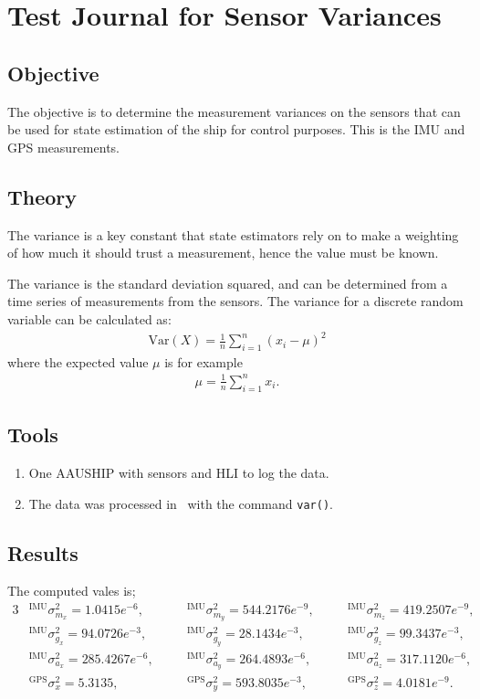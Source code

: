 \chapter{Test Journal for Sensor Variances}
\label{sc:variances}

\section{Objective}
The objective is to determine the measurement variances on the sensors
that can be used for state estimation of the ship for control
purposes. This is the \ac{IMU} and \ac{GPS} measurements.

\section{Theory}
The variance is a key constant that state estimators rely on to make a weighting of
how much it should trust a measurement, hence the value must be known.

The variance is the standard deviation squared, and can be determined
from a time series of measurements from the sensors. The variance for
a discrete random variable can be calculated as:
\begin{align}
	\mathrm{Var}(X) = \frac{1}{n} \sum_{i=1}^n (x_i - \mu) ^2
\end{align}
where the expected value $\mu$ is for example
\begin{align}
	\mu = \frac{1}{n} \sum_{i=1}^n x_i.
\end{align}

\section{Tools}
\begin{enumerate}
	\item One AAUSHIP with sensors and \ac{HLI} to log the data.
	\item The data was processed in \MATLAB\ with the command
		\texttt{var()}.
\end{enumerate}

\section{Results}

The computed vales is;
\begin{alignat*}{3}
&^\text{IMU}\sigma_{m_x}^2 = 1.0415e^{-6},
\quad& &
^\text{IMU}\sigma_{m_y}^2 = 544.2176e^{-9},
\quad& &
^\text{IMU}\sigma_{m_z}^2 = 419.2507e^{-9},
\\ \nonumber
&^\text{IMU}\sigma_{g_x}^2 = 94.0726e^{-3},
\quad& &
^\text{IMU}\sigma_{g_y}^2 = 28.1434e^{-3},
\quad& &
^\text{IMU}\sigma_{g_z}^2 = 99.3437e^{-3},
\\ \nonumber
&^\text{IMU}\sigma_{a_x}^2 = 285.4267e^{-6},
\quad& &
^\text{IMU}\sigma_{a_y}^2 = 264.4893e^{-6},
\quad& &
^\text{IMU}\sigma_{a_z}^2 = 317.1120e^{-6},
\\ \nonumber
&^\text{GPS}\sigma_{x}^2 = 5.3135,
\quad& &
^\text{GPS}\sigma_{y}^2 = 593.8035e^{-3},
\quad& &
^\text{GPS}\sigma_{z}^2 = 4.0181e^{-9}.
\end{alignat*}

